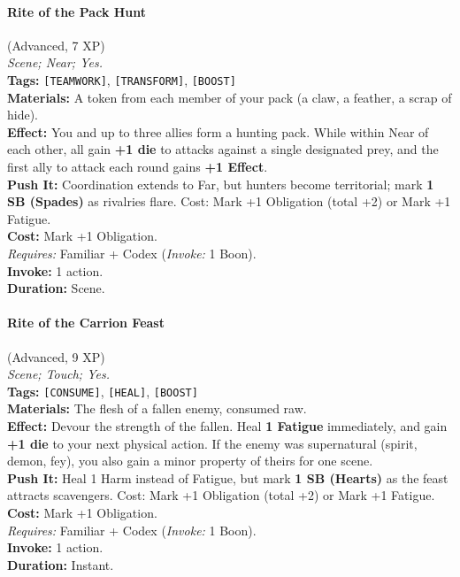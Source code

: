 \paragraph{Rite of the Pack Hunt} (Advanced, 7 XP) \hfill \\
\emph{Scene; Near; Yes.} \\
\textbf{Tags:} \texttt{[TEAMWORK]}, \texttt{[TRANSFORM]}, \texttt{[BOOST]} \\
\textbf{Materials:} A token from each member of your pack (a claw, a feather, a scrap of hide). \\
\textbf{Effect:} You and up to three allies form a hunting pack. While within Near of each other, all gain \textbf{+1 die} to attacks against a single designated prey, and the first ally to attack each round gains \textbf{+1 Effect}. \\
\textbf{Push It:} Coordination extends to Far, but hunters become territorial; mark \textbf{1 SB (Spades)} as rivalries flare. Cost: Mark +1 Obligation (total +2) or Mark +1 Fatigue. \\
\textbf{Cost:} Mark +1 Obligation. \\
\textit{Requires:} Familiar + Codex (\textit{Invoke:} 1 Boon). \\
\textbf{Invoke:} 1 action. \\
\textbf{Duration:} Scene.

\paragraph{Rite of the Carrion Feast} (Advanced, 9 XP) \hfill \\
\emph{Scene; Touch; Yes.} \\
\textbf{Tags:} \texttt{[CONSUME]}, \texttt{[HEAL]}, \texttt{[BOOST]} \\
\textbf{Materials:} The flesh of a fallen enemy, consumed raw. \\
\textbf{Effect:} Devour the strength of the fallen. Heal \textbf{1 Fatigue} immediately, and gain \textbf{+1 die} to your next physical action. If the enemy was supernatural (spirit, demon, fey), you also gain a minor property of theirs for one scene. \\
\textbf{Push It:} Heal 1 Harm instead of Fatigue, but mark \textbf{1 SB (Hearts)} as the feast attracts scavengers. Cost: Mark +1 Obligation (total +2) or Mark +1 Fatigue. \\
\textbf{Cost:} Mark +1 Obligation. \\
\textit{Requires:} Familiar + Codex (\textit{Invoke:} 1 Boon). \\
\textbf{Invoke:} 1 action. \\
\textbf{Duration:} Instant.

